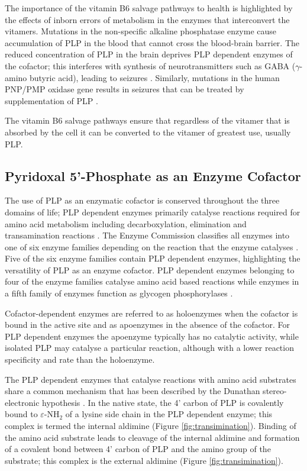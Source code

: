 The importance of the vitamin B6 salvage pathways to health is highlighted by the effects of inborn errors of metabolism in the enzymes that interconvert the vitamers. Mutations in the non-specific alkaline phosphatase enzyme cause accumulation of PLP in the blood that cannot cross the blood-brain barrier. The reduced concentration of PLP in the brain deprives PLP dependent enzymes of the cofactor; this interferes with synthesis of neurotransmitters such as GABA ($\gamma$-amino butyric acid), leading to seizures \cite{Waymire1995}. Similarly, mutations in the  human PNP/PMP oxidase gene results in seizures that can be treated by supplementation of PLP \cite{Mills2014}. 

The vitamin B6 salvage pathways ensure that regardless of the vitamer that is absorbed by the cell it can be converted to the vitamer of greatest use, usually PLP.\par


\subsection{Pyridoxal 5'-Phosphate as an Enzyme Cofactor}
The use of PLP as an enzymatic cofactor is conserved throughout the three domains of life; PLP dependent enzymes primarily catalyse reactions required for amino acid metabolism including decarboxylation, elimination and transamination reactions \cite{Percudani2009}. The Enzyme Commission classifies all enzymes into one of six enzyme families depending on the reaction that the enzyme catalyses \cite{Percudani2003}. Five of the six enzyme families contain PLP dependent enzymes, highlighting the versatility of PLP as an enzyme cofactor. PLP dependent enzymes belonging to four of the enzyme families catalyse amino acid based reactions while enzymes in a fifth family of enzymes function as glycogen phosphorylases \cite{Percudani2009}. \par
 
Cofactor-dependent enzymes are referred to as holoenzymes when the cofactor is bound in the active site and as apoenzymes in the absence of the cofactor. For PLP dependent enzymes the apoenzyme typically has no catalytic activity, while isolated PLP may catalyse a particular reaction, although with a lower reaction specificity and rate than the holoenzyme. 

The PLP dependent enzymes that catalyse reactions with amino acid substrates share a common mechanism that has been described by the Dunathan stereo-electronic hypothesis \cite{Dunathan1966}. In the native state, the 4' carbon of PLP is covalently bound to $\varepsilon$-NH$_2$ of a lysine side chain in the PLP dependent enzyme; this complex is termed the internal aldimine (Figure \ref{fig:transimination}). Binding of the amino acid substrate leads to cleavage of the internal aldimine and formation of a covalent bond between 4' carbon of PLP and the amino group of the substrate; this complex is the external aldimine (Figure \ref{fig:transimination}).


